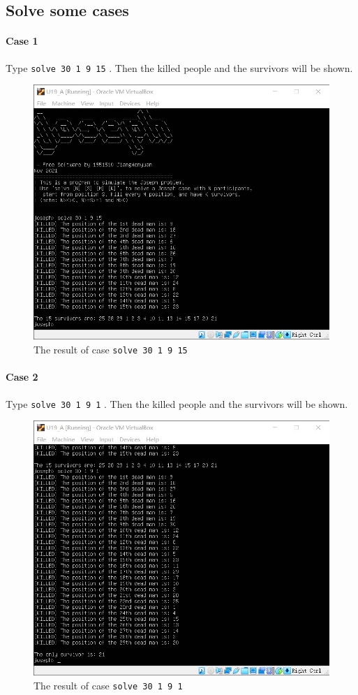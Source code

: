 \documentclass[cn,black,12pt,normal]{elegantnote}
\begin{document}
\subsection{Solve some cases}

\paragraph{Case 1} Type \lstinline{solve 30 1 9 15} . Then the killed people and the survivors will be shown.

\begin{figure}[H]
    \centering
    \includegraphics[width=0.7\linewidth]{image/j02.jpg}
    \caption{The result of case \lstinline{solve 30 1 9 15}}
\end{figure}

\paragraph{Case 2} Type \lstinline{solve 30 1 9 1} . Then the killed people and the survivors will be shown.

\begin{figure}[H]
    \centering
    \includegraphics[width=0.7\linewidth]{image/j03.jpg}
    \caption{The result of case \lstinline{solve 30 1 9 1}}
\end{figure}
\end{document}
